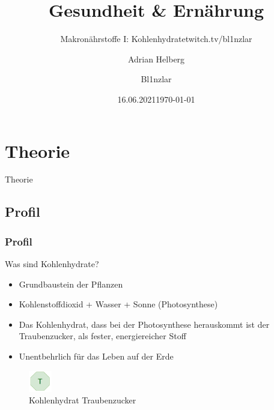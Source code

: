 \documentclass[xcolor=dvipsnames]{beamer}
\title{Gesundheit \& Ernährung}
\subtitle{Makronährstoffe I: Kohlenhydrate}
\author{Adrian Helberg}
\date{16.06.2021}
\subtitle{twitch.tv/bl1nzlar}
\author{Bl1nzlar}
\date{\today}
\begin{document}
    \maketitle


    \section{Theorie}
    {
    \begin{frame}
        \begin{center}
            \Huge Theorie
        \end{center}
    \end{frame}
    }

    \subsection{Profil}
    \begin{frame}
        \frametitle{Profil}

        \begin{block}{Was sind Kohlenhydrate?}
            \begin{itemize}
                \setlength\itemsep{1em}
                \item Grundbaustein der Pflanzen
                \item Kohlenstoffdioxid + Wasser + Sonne (Photosynthese)
                \item Das Kohlenhydrat, dass bei der Photosynthese herauskommt ist der Traubenzucker, als fester, energiereicher Stoff
                \item Unentbehrlich für das Leben auf der Erde
            \end{itemize}
        \end{block}

        \begin{figure}
            \centering
            \includegraphics[width=1cm]{../images/t.png}
            \caption{Kohlenhydrat Traubenzucker}
        \end{figure}
    \end{frame}
\end{document}
